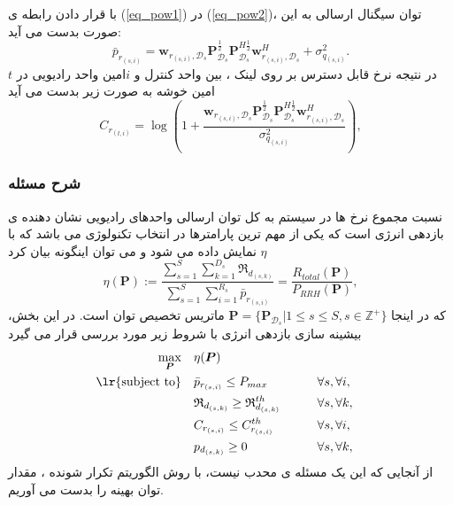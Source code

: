 با قرار دادن رابطه ی  (\ref{eq_pow1}) در (\ref{eq_pow2})، توان سیگنال ارسالی به این صورت بدست می آید:
\begin{equation}
\bar{p}_{r_{(s,i)}} = \boldsymbol{w}_{r_{(s,i)},\mathcal{D}_{s}} \boldsymbol{P}_{\mathcal{D}_s}^{\frac{1}{2}} \boldsymbol{P}_{\mathcal{D}_s}^{H \frac{1}{2}}   \boldsymbol{w}_{r_{(s,i)},\mathcal{D}_{s}}^H + \sigma_{q_{(s,i)}}^2.
\end{equation}
در نتیجه نرخ قابل دسترس بر روی لینک ، بین واحد کنترل و $i$امین واحد رادیویی در $t$امین خوشه  به صورت زیر بدست می آید 
\begin{equation}
C_{r_{(t,i)}} = \log{(1+\frac{\boldsymbol{w}_{r_{(s,i)},\mathcal{D}_{s}} \boldsymbol{P}_{\mathcal{D}_s}^{\frac{1}{2}} \boldsymbol{P}_{\mathcal{D}_s}^{H \frac{1}{2}}   \boldsymbol{w}_{r_{(s,i)},\mathcal{D}_{s}}^H }{ \sigma_{q_{(s,i)}}^2})},
\end{equation}
\subsubsection{شرح مسئله}
نسبت مجموع نرخ ها در سیستم به کل توان ارسالی واحدهای رادیویی نشان دهنده ی بازدهی انرژی است که یکی از مهم ترین پارامترها در انتخاب تکنولوژی می باشد که با $\eta$ نمایش داده می شود و می توان اینگونه بیان کرد
\begin{equation}\label{eta}
\eta(\boldsymbol{P}) := \frac{\sum\limits_{s=1}^{S} \sum\limits_{k=1}^{{D}_s}\mathfrak{R}_{d_{(s,k)}} }{\sum\limits_{s=1}^{S} \sum\limits_{i=1}^{{R}_s}\bar{p}_{r_{(s,i)}}} = \frac{R_{total}(\boldsymbol{P})}{P_{RRH}(\boldsymbol{P})},
\end{equation}
که در اینجا  $ \boldsymbol{P} = \{ \boldsymbol{P}_{\mathcal{D}_s}|  1 \leq s \leq S, s \in \mathbb{Z}^{+} \}$ ماتریس تخصیص توان است. در این بخش، بیشینه سازی بازدهی انرژی با شروط زیر مورد بررسی قرار می گیرد 
\begin{equation}\label{p1}
\begin{aligned}
\max\limits_{\boldsymbol{P}}   \quad &   \eta(\boldsymbol{P})\\
\text{\lr{subject to}} \quad  & \bar{p}_{r_{(s,i)}} \leq P_{max} && \qquad \forall s, \forall i,   \\
&\mathfrak{R}_{d_{(s,k)}} \geq  \mathfrak{R}_{d_{(s,k)}}^{th} && \qquad \forall s, \forall k, \\
&C_{r_{(s,i)}} \leq C_{r_{(s,i)}}^{th}  &&\qquad \forall s, \forall i, \\
&p_{d_{(s,k)}}  \geq 0                                  &&\qquad \forall s, \forall k, \\
\end{aligned}			
\end{equation}
از آنجایی که این یک مسئله ی محدب نیست، با روش الگوریتم تکرار شونده ، مقدار توان بهینه را بدست می آوریم\cite{boyd}.
